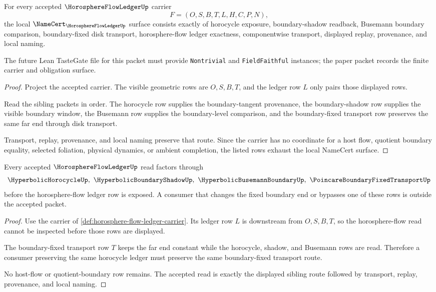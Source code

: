 \begin{theorem}
\label{thm:horosphere-flow-ledger-namecert-obligations}
For every accepted $\HorosphereFlowLedgerUp$ carrier
$$
F=(O,S,B,T,L,H,C,P,N),
$$
the local $\NameCert_{\HorosphereFlowLedgerUp}$ surface consists exactly of horocycle exposure, boundary-shadow readback, Busemann boundary comparison, boundary-fixed disk transport, horosphere-flow ledger exactness, componentwise transport, displayed replay, provenance, and local naming.

The future Lean TasteGate file for this packet must provide \texttt{Nontrivial} and \texttt{FieldFaithful} instances; the paper packet records the finite carrier and obligation surface.
\end{theorem}
\begin{proof}
Project the accepted carrier. The visible geometric rows are $O,S,B,T$, and the ledger row $L$ only pairs those displayed rows.

Read the sibling packets in order. The horocycle row supplies the boundary-tangent provenance, the boundary-shadow row supplies the visible boundary window, the Busemann row supplies the boundary-level comparison, and the boundary-fixed transport row preserves the same far end through disk transport.

Transport, replay, provenance, and local naming preserve that route. Since the carrier has no coordinate for a host flow, quotient boundary equality, selected foliation, physical dynamics, or ambient completion, the listed rows exhaust the local NameCert surface.
\end{proof}

\begin{theorem}
\label{thm:horosphere-flow-ledger-boundary-fixed-route}
Every accepted $\HorosphereFlowLedgerUp$ read factors through
$$
\HyperbolicHorocycleUp,\ \HyperbolicBoundaryShadowUp,\ \HyperbolicBusemannBoundaryUp,\ \PoincareBoundaryFixedTransportUp
$$
before the horosphere-flow ledger row is exposed. A consumer that changes the fixed boundary end or bypasses one of these rows is outside the accepted packet.
\end{theorem}
\begin{proof}
Use the carrier of \autoref{def:horosphere-flow-ledger-carrier}. Its ledger row $L$ is downstream from $O,S,B,T$, so the horosphere-flow read cannot be inspected before those rows are displayed.

The boundary-fixed transport row $T$ keeps the far end constant while the horocycle, shadow, and Busemann rows are read. Therefore a consumer preserving the same horocycle ledger must preserve the same boundary-fixed transport route.

No host-flow or quotient-boundary row remains. The accepted read is exactly the displayed sibling route followed by transport, replay, provenance, and local naming.
\end{proof}

